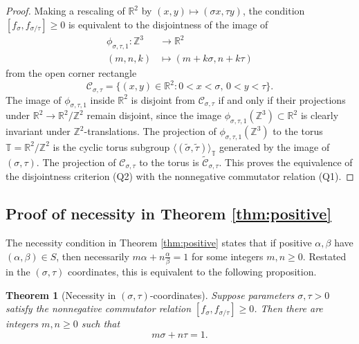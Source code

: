 \documentclass[11pt, letterpaper, reqno]{amsart}
\newtheorem{thm}{Theorem}[section]
\theoremstyle{definition}
\numberwithin{equation}{section}
\newcommand{\RR}{\ensuremath{\mathbb{R}}}
\newcommand{\ZZ}{\ensuremath{\mathbb{Z}}}
\newcommand{\TT}{\mathbb{T}}
\newcommand{\cC}{\mathcal{C}}
\newcommand{\cCbar}{\widetilde{\mathcal{C}}}
\newcommand{\talpha}{{\sigma}}
\newcommand{\trho}{{\tau}}
\begin{document}
{\begin{proof}
Making a rescaling of $\RR^2$ by $(x,y) \mapsto (\talpha x, \trho y)$, 
the condition $[f_\talpha, f_{\talpha/\trho}] \geq 0$
is equivalent to the disjointness of the image of
\begin{align*}
\phi_{\talpha,\trho,1} : \ZZ^3 &\to \RR^2 \\
(m,n,k) &\mapsto (m + k\talpha, n + k\trho) 
\end{align*}
from the open corner rectangle
$$
\cC_{\talpha,\trho} = \{(x,y)\in \RR^2 :  0 < x < \talpha,\, 0< y < \trho \}.
$$
The image of $\phi_{\talpha,\trho,1}$  inside $\RR^2$ 
 is  disjoint from $\cC_{\talpha,\trho}$
 if and only if their projections under $\RR^2 \to \RR^2 / \ZZ^2$ remain disjoint, 
 since the image $\phi_{\talpha,\trho,1}(\ZZ^3)\subset\RR^2$ 
 is clearly invariant under $\ZZ^2$-translations.
The projection of $\phi_{\talpha,\trho,1}(\ZZ^3)$ to the torus $\TT = \RR^2 / \ZZ^2$ 
is the cyclic torus subgroup $\langle (\widetilde{\talpha},\widetilde{\trho}) \rangle_{\TT}$ 
generated by the image of $(\talpha,\trho)$.
The projection of $\cC_{\talpha, \trho}$ to the torus is $\cCbar_{\talpha,\trho}$.
This proves the equivalence of the disjointness criterion (Q2) with the nonnegative commutator relation (Q1).
\end{proof}


%
%
\subsection{Proof of necessity in Theorem \ref{thm:positive}}
\label{subsec:pos-necessary}

The necessity condition in Theorem \ref{thm:positive} states that if
positive $\alpha, \beta$ have $(\alpha, \beta) \in S$, then necessarily
$ m \alpha + n \frac{\alpha}{\beta} =1$ for some  integers $m, n \ge 0$.
Restated in the  $(\talpha,\trho)$ coordinates, this is equivalent to the following proposition.


\begin{thm}[Necessity  in $(\talpha, \trho)$-coordinates]
\label{thm:pos-necessary}
Suppose parameters $\talpha, \trho>0$ satisfy
the nonnegative commutator relation $[f_{\talpha}, f_{\talpha/\trho}] \geq 0$.
Then there are integers $m,n\geq 0$ such that
\begin{equation*}
{m}\talpha + {n}\trho = 1.
\end{equation*}
\end{thm}

}
\end{document}
